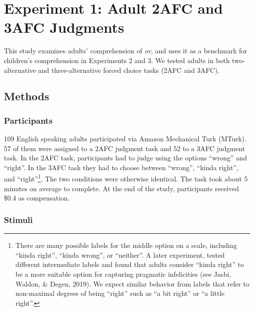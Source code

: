 \documentclass[,man,floatsintext]{apa6}
\let\rmarkdownfootnote\footnote%
\def\footnote{\protect\rmarkdownfootnote}
\begin{document}
\hypertarget{study1}{%
\section{Experiment 1: Adult 2AFC and 3AFC Judgments}\label{study1}}

This study examines adults' comprehension of \emph{or}, and uses it as a benchmark for children's comprehension in Experiments 2 and 3. We tested adults in both two-alternative and three-alternative forced choice tasks (2AFC and 3AFC).

\hypertarget{methods}{%
\subsection{Methods}\label{methods}}

\hypertarget{participants}{%
\subsubsection{Participants}\label{participants}}

109 English speaking adults participated via Amazon Mechanical Turk (MTurk). 57 of them were assigned to a 2AFC judgment task and 52 to a 3AFC judgment task. In the 2AFC task, participants had to judge using the options \enquote{wrong} and \enquote{right}. In the 3AFC task they had to choose between \enquote{wrong}, \enquote{kinda right}, and \enquote{right}\footnote{There are many possible labels for the middle option on a scale, including \enquote{kinda right}, \enquote{kinda wrong}, or \enquote{neither}. A later experiment, tested different intermediate labels and found that adults consider \enquote{kinda right} to be a more suitable option for capturing pragmatic infelicities (see Jasbi, Waldon, \& Degen, 2019). We expect similar behavior from labels that refer to non-maximal degrees of being \enquote{right} such as \enquote{a bit right} or \enquote{a little right}.}. The two conditions were otherwise identical. The task took about 5 minutes on average to complete. At the end of the study, participants received \$0.4 as compensation.

\hypertarget{stimuli}{%
\subsubsection{Stimuli}\label{stimuli}}
\end{document}
